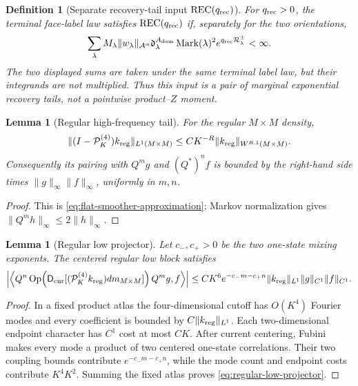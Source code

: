 \documentclass[11pt]{article}
\newtheorem{lemma}[theorem]{Lemma}
\newtheorem{definition}[theorem]{Definition}
\begin{document}
\begin{definition}[Separate recovery-tail input $\mathrm{REC}(q_{\rm rec})$]
\label{def:separate-recovery-tail}
For $q_{\rm rec}>0$, the terminal face-label law satisfies
$\mathrm{REC}(q_{\rm rec})$ if, separately for the two orientations,
\begin{equation}
\label{eq:separate-recovery-moments}
 \sum_\lambda M_\lambda\|w_\lambda\|_{\mathcal A^\alpha}
 \mathfrak d_\lambda^{A_{\rm dom}}\operatorname{Mark}(\lambda)^2
 e^{q_{\rm rec}\mathcal R_\lambda^\pm}<\infty.
\end{equation}
The two displayed sums are taken under the same terminal label law, but their
integrands are not multiplied.  Thus this input is a pair of marginal
exponential recovery tails, not a pointwise product--$Z$ moment.
\end{definition}

\begin{lemma}[Regular high-frequency tail]
\label{lem:regular-high-tail}
For the regular $M\times M$ density,
\begin{equation}
\label{eq:regular-high-tail}
 \|(I-\mathcal P_K^{(4)})k_{\rm reg}\|_{L^1(M\times M)}
 \le CK^{-R}\|k_{\rm reg}\|_{W^{R,1}(M\times M)}.
\end{equation}
Consequently its pairing with $Q^mg$ and $(Q^*)^nf$ is bounded by the right-hand
side times $\|g\|_\infty\|f\|_\infty$, uniformly in $m,n$.
\end{lemma}

\begin{proof}
This is \eqref{eq:flat-smoother-approximation}; Markov normalization gives
$\|Q^mh\|_\infty\le2\|h\|_\infty$.
\end{proof}

\begin{lemma}[Regular low projector]
\label{lem:regular-low-projector}
Let $c_-,c_+>0$ be the two one-state mixing exponents.  The centered regular
low block satisfies
\begin{equation}
\label{eq:regular-low-projector}
 \left|\left\langle Q^n\operatorname{Op}\!\left(
 \mathsf D_{\rm cur}[(\mathcal P_K^{(4)}k_{\rm reg})dm_{M\times M}]
 \right)Q^mg,f\right\rangle\right|
 \le CK^6e^{-c_-m-c_+n}\|k_{\rm reg}\|_{L^1}
       \|g\|_{C^1}\|f\|_{C^1}.
\end{equation}
\end{lemma}

\begin{proof}
In a fixed product atlas the four-dimensional cutoff has $O(K^4)$ Fourier
modes and every coefficient is bounded by $C\|k_{\rm reg}\|_{L^1}$.
Each two-dimensional endpoint character has $C^1$ cost at most $CK$.
After current centering, Fubini makes every mode a product of two centered
one-state correlations.  Their two coupling bounds contribute
$e^{-c_-m-c_+n}$, while the mode count and endpoint costs contribute
$K^4K^2$.  Summing the fixed atlas proves
\eqref{eq:regular-low-projector}.
\end{proof}
\end{document}
